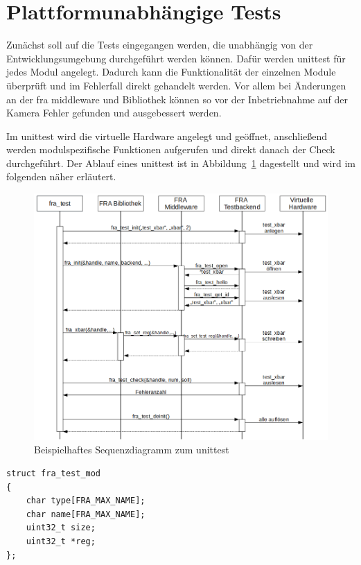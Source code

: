\section{Plattformunabhängige Tests}
Zunächst soll auf die Tests eingegangen werden, die unabhängig von der Entwicklungsumgebung durchgeführt werden können. 
Dafür werden \gls{unittest} für jedes  Modul angelegt. Dadurch kann die Funktionalität der einzelnen Module überprüft und im Fehlerfall direkt gehandelt werden. Vor allem bei Änderungen an der \ac{fra} \gls{middleware} und Bibliothek können so vor der Inbetriebnahme auf der Kamera Fehler gefunden und ausgebessert werden.


Im \gls{unittest} wird die virtuelle Hardware angelegt und geöffnet, anschließend werden modulspezifische Funktionen aufgerufen und direkt danach der Check durchgeführt. Der Ablauf eines \gls{unittest} ist in Abbildung~\ref{fig:testbackend} dagestellt und wird im folgenden näher erläutert.


\begin{figure}[!hbtp]
	\centering
	\includegraphics[width = \linewidth]{pictures/2019-11-28-testbackend.png}
	\smallskip
	\caption{Beispielhaftes Sequenzdiagramm zum \gls{unittest}}
	\label{fig:testbackend}
\end{figure} 


\begin{lstfloat}
\begin{lstlisting}
struct fra_test_mod
{
	char type[FRA_MAX_NAME];
	char name[FRA_MAX_NAME];
	uint32_t size;
	uint32_t *reg;
};
\end{lstlisting}
\end{lstfloat}

